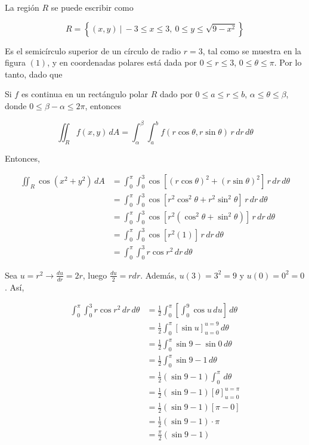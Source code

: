 \documentclass[12pt]{exam}
\begin{document}
\begin{questions}
\begin{enumerate}[a)]
    La región $R$ se puede escribir como

    \[
    R= \left\{(x,y)~|~-3 \leq x \leq 3 ,~ 0 \leq y \leq \sqrt{9-x^2}\right\}
    \]

    Es el semicírculo superior de un círculo de radio $r=3$, tal como se muestra en la figura $(1)$, y en coordenadas polares está dada por $0 \leq r \leq 3$, $0 \leq \theta \leq \pi$. Por lo tanto, dado que

    \begin{tcolorbox}[colback=white!0!white, colframe=blue!40!black, title=\textbf{Cambio a coordenadas polares en una integral doble}]
      Si $f$ es continua en un rectángulo polar $R$ dado por $0 \leq a \leq r \leq b$, $\alpha \leq \theta \leq \beta$, donde $0 \leq \beta - \alpha \leq 2\pi$, entonces
      
      \begin{equation}
        \iint_R f(x,y)\,dA= \int_{\alpha}^{\beta} \int_a^b f(r\cos{\theta}, r\sin{\theta})\,r\,dr\,d\theta
        \label{eq:cambio1a}
      \end{equation}
      
    \end{tcolorbox}

    Entonces,

    \begin{align*}
      \iint_R \cos{(x^2+y^2)}\,dA
      &= \int_0^{\pi} \int_0^3 \cos{[(r\cos{\theta})^2 + (r\sin{\theta})^2]} \,r\,dr\,d\theta \\
      &= \int_0^{\pi} \int_0^3 \cos{[r^2\cos^2{\theta} + r^2\sin^2{\theta}]} \,r\,dr\,d\theta \\
      &= \int_0^{\pi} \int_0^3 \cos{[r^2(\cos^2{\theta} + \sin^2{\theta})]} \,r\,dr\,d\theta \\
      &= \int_0^{\pi} \int_0^3 \cos{[r^2(1)]} \,r\,dr\,d\theta \\
      &= \int_0^{\pi} \int_0^3 r \cos{r^2} \,dr\,d\theta 
    \end{align*}

    Sea $u=r^2 \rightarrow \frac{du}{dr}=2r$, luego $\frac{du}{2}=rdr$. Además, $u(3)=3^2=9$ y $u(0)=0^2=0$. Así,

    \begin{align*}
      \int_0^{\pi} \int_0^3 r \cos{r^2} \,dr\,d\theta
      &= \frac{1}{2}  \int_0^{\pi} \left[\int_0^9 \cos{u}\,du \right] \,d\theta \\
      &= \frac{1}{2}  \int_0^{\pi} \left[\sin{u} \right]_{u=0}^{u=9} \,d\theta \\
      &= \frac{1}{2}  \int_0^{\pi} \sin{9}-\sin{0} \,d\theta \\
      &= \frac{1}{2}  \int_0^{\pi} \sin{9}-1 \,d\theta \\
      &= \frac{1}{2} (\sin{9}-1) \int_0^{\pi} \,d\theta \\
      &= \frac{1}{2} (\sin{9}-1)  \left[\theta\right]_{u=0}^{u=\pi} \\
      &= \frac{1}{2} (\sin{9}-1)  \left[\pi - 0\right] \\
      &= \frac{1}{2} (\sin{9}-1)  \cdot \pi \\
      &= \frac{\pi}{2}(\sin{9}-1)
    \end{align*}


\end{enumerate}
\end{questions}
\end{document}
